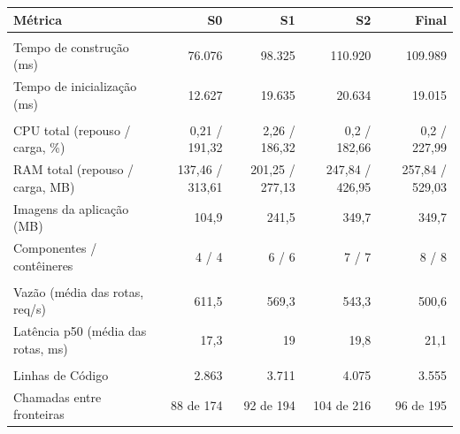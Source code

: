 \begin{quadro}[htb]
  \centering
  \caption{Leilões --- métricas por snapshot --- Transações.}
  \label{qua:comp_auction_transacoes_snapshots}
  \renewcommand{\arraystretch}{1.15}
  \begin{tabularx}{\textwidth}{|>{\raggedright\arraybackslash}X|r|r|r|r|}
    \hline
    \textbf{Métrica} & \textbf{S0} & \textbf{S1} & \textbf{S2} & \textbf{Final} \\
    \hline
    \multicolumn{5}{|l|}{\textbf{Agilidade}} \\
    \hline
    Tempo de construção (ms) & 76.076 & 98.325 & 110.920 & 109.989 \\
    Tempo de inicialização (ms) & 12.627 & 19.635 & 20.634 & 19.015 \\
    \hline
    \multicolumn{5}{|l|}{\textbf{Custo}} \\
    \hline
    CPU total (repouso / carga, \%) & 0,21 / 191,32 & 2,26 / 186,32 & 0,2 / 182,66 & 0,2 / 227,99 \\
    RAM total (repouso / carga, MB) & 137,46 / 313,61 & 201,25 / 277,13 & 247,84 / 426,95 & 257,84 / 529,03 \\
    Imagens da aplicação (MB) & 104,9 & 241,5 & 349,7 & 349,7 \\
    Componentes / contêineres & 4 / 4 & 6 / 6 & 7 / 7 & 8 / 8 \\
    \hline
    \multicolumn{5}{|l|}{\textbf{Desempenho}} \\
    \hline
    Vazão (média das rotas, req/s) & 611,5 & 569,3 & 543,3 & 500,6 \\
    Latência p50 (média das rotas, ms) & 17,3 & 19 & 19,8 & 21,1 \\
    \hline
    \multicolumn{5}{|l|}{\textbf{Manutenibilidade}} \\
    \hline
    Linhas de Código & 2.863 & 3.711 & 4.075 & 3.555 \\
    Chamadas entre fronteiras & 88 de 174 & 92 de 194 & 104 de 216 & 96 de 195 \\
    \hline
  \end{tabularx}
\end{quadro}

